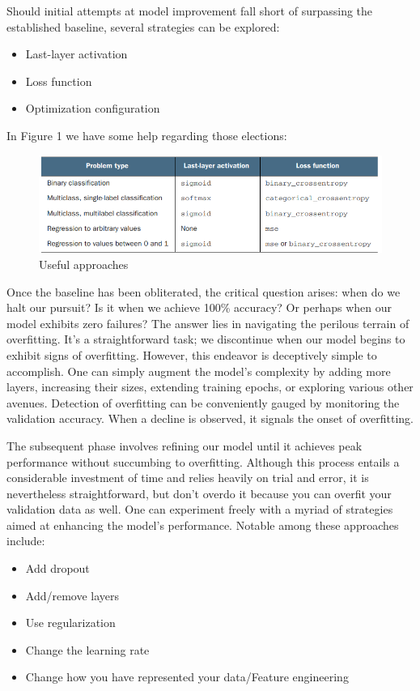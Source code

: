 \documentclass[12pt]{article}
\begin{document}
Should initial attempts at model improvement fall short of surpassing the established baseline, several strategies can be explored:
\begin{itemize}
    \item Last-layer activation
    \item Loss function
    \item Optimization configuration
\end{itemize}
 In Figure 1 we have some help regarding those elections:
\begin{figure}
    \centering
    \includegraphics[width=1\linewidth]{image.png}
    \caption{Useful approaches}
    \label{fig:enter-label}
\end{figure}

Once the baseline has been obliterated, the critical question arises: when do we halt our pursuit? Is it when we achieve 100\% accuracy? Or perhaps when our model exhibits zero failures? The answer lies in navigating the perilous terrain of overfitting. It's a straightforward task; we discontinue when our model begins to exhibit signs of overfitting. However, this endeavor is deceptively simple to accomplish. One can simply augment the model's complexity by adding more layers, increasing their sizes, extending training epochs, or exploring various other avenues. Detection of overfitting can be conveniently gauged by monitoring the validation accuracy. When a decline is observed, it signals the onset of overfitting.

The subsequent phase involves refining our model until it achieves peak performance without succumbing to overfitting. Although this process entails a considerable investment of time and relies heavily on trial and error, it is nevertheless straightforward, but don't overdo it because you can overfit your validation data as well. One can experiment freely with a myriad of strategies aimed at enhancing the model's performance. Notable among these approaches include:
\begin{itemize}
    \item Add dropout
    \item Add/remove layers
    \item Use regularization
    \item Change the learning rate
    \item Change how you have represented your data/Feature engineering
\end{itemize}
\end{document}

